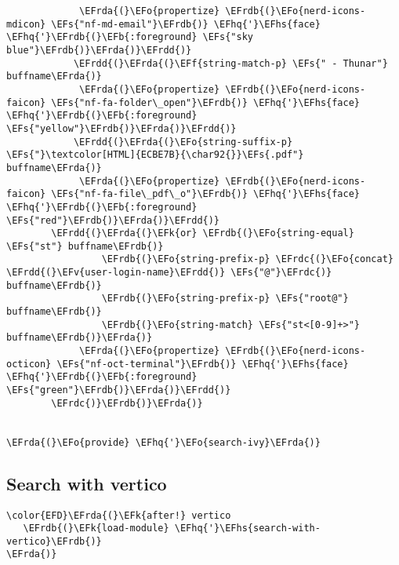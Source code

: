 \documentclass[a4wide,10pt]{article}
\newcommand{\EFs}[1]{\textcolor{EFs}{#1}} %
\newcommand{\EFk}[1]{\textcolor{EFk}{#1}} %
\newcommand{\EFb}[1]{\textcolor{EFb}{#1}} %
\newcommand{\EFf}[1]{\textcolor{EFf}{#1}} %
\newcommand{\EFv}[1]{\textcolor{EFv}{#1}} %
\newcommand{\EFo}[1]{\textcolor{EFo}{#1}} %
\newcommand{\EFhq}[1]{\textcolor{EFhq}{#1}} %
\newcommand{\EFhs}[1]{\textcolor{EFhs}{#1}} %
\newcommand{\EFrda}[1]{\textcolor{EFrda}{#1}} %
\newcommand{\EFrdb}[1]{\textcolor{EFrdb}{#1}} %
\newcommand{\EFrdc}[1]{\textcolor{EFrdc}{#1}} %
\newcommand{\EFrdd}[1]{\textcolor{EFrdd}{#1}} %
\begin{document}
\begin{Code}
\begin{Verbatim}
             \EFrda{(}\EFo{propertize} \EFrdb{(}\EFo{nerd-icons-mdicon} \EFs{"nf-md-email"}\EFrdb{)} \EFhq{'}\EFhs{face} \EFhq{'}\EFrdb{(}\EFb{:foreground} \EFs{"sky blue"}\EFrdb{)}\EFrda{)}\EFrdd{)}
            \EFrdd{(}\EFrda{(}\EFf{string-match-p} \EFs{" - Thunar"} buffname\EFrda{)}
             \EFrda{(}\EFo{propertize} \EFrdb{(}\EFo{nerd-icons-faicon} \EFs{"nf-fa-folder\_open"}\EFrdb{)} \EFhq{'}\EFhs{face} \EFhq{'}\EFrdb{(}\EFb{:foreground} \EFs{"yellow"}\EFrdb{)}\EFrda{)}\EFrdd{)}
            \EFrdd{(}\EFrda{(}\EFo{string-suffix-p} \EFs{"}\textcolor[HTML]{ECBE7B}{\char92{}}\EFs{.pdf"} buffname\EFrda{)}
             \EFrda{(}\EFo{propertize} \EFrdb{(}\EFo{nerd-icons-faicon} \EFs{"nf-fa-file\_pdf\_o"}\EFrdb{)} \EFhq{'}\EFhs{face} \EFhq{'}\EFrdb{(}\EFb{:foreground} \EFs{"red"}\EFrdb{)}\EFrda{)}\EFrdd{)}
	    \EFrdd{(}\EFrda{(}\EFk{or} \EFrdb{(}\EFo{string-equal} \EFs{"st"} buffname\EFrdb{)}
                 \EFrdb{(}\EFo{string-prefix-p} \EFrdc{(}\EFo{concat} \EFrdd{(}\EFv{user-login-name}\EFrdd{)} \EFs{"@"}\EFrdc{)} buffname\EFrdb{)}
                 \EFrdb{(}\EFo{string-prefix-p} \EFs{"root@"} buffname\EFrdb{)}
                 \EFrdb{(}\EFo{string-match} \EFs{"st<[0-9]+>"} buffname\EFrdb{)}\EFrda{)}
             \EFrda{(}\EFo{propertize} \EFrdb{(}\EFo{nerd-icons-octicon} \EFs{"nf-oct-terminal"}\EFrdb{)} \EFhq{'}\EFhs{face} \EFhq{'}\EFrdb{(}\EFb{:foreground} \EFs{"green"}\EFrdb{)}\EFrda{)}\EFrdd{)}
	    \EFrdc{)}\EFrdb{)}\EFrda{)}


\EFrda{(}\EFo{provide} \EFhq{'}\EFo{search-ivy}\EFrda{)}
\end{Verbatim}
\end{Code}
\subsection{Search with vertico}
\label{sec:orge303333}
\begin{Code}
\begin{Verbatim}
\color{EFD}\EFrda{(}\EFk{after!} vertico
   \EFrdb{(}\EFk{load-module} \EFhq{'}\EFhs{search-with-vertico}\EFrdb{)}
\EFrda{)}
\end{Verbatim}
\end{Code}
\end{document}
